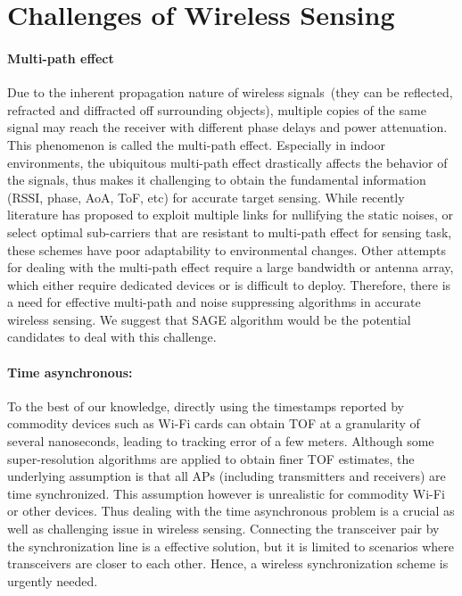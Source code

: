 \section{Challenges of Wireless Sensing}

\paragraph*{Multi-path effect}  Due to the inherent propagation nature of wireless signals~(they can be reflected, refracted and diffracted off
surrounding objects), multiple copies of the same signal may reach the receiver with different phase delays and power attenuation. This
phenomenon is called the multi-path effect. Especially in indoor environments, the ubiquitous multi-path effect drastically affects the
behavior of the signals, thus makes it challenging to obtain the fundamental information (RSSI, phase, AoA, ToF, etc) for accurate target
sensing. While recently literature has proposed to exploit multiple links for nullifying the static noises, or select optimal sub-carriers
that are resistant to multi-path effect for sensing task, these schemes have poor adaptability to environmental changes. Other attempts for
dealing with the multi-path effect require a large bandwidth or antenna array, which either require dedicated devices or is difficult to
deploy. Therefore, there is a need for effective multi-path and noise suppressing algorithms in accurate wireless sensing. We suggest that
SAGE algorithm would be the potential candidates to deal with this challenge.

\paragraph*{Time asynchronous:} To the best of our knowledge, directly using the timestamps reported by commodity devices such as Wi-Fi cards can obtain TOF at a granularity of several nanoseconds, leading to tracking error of a few meters. Although some super-resolution algorithms are applied to obtain finer TOF estimates, the underlying assumption is that all APs (including transmitters and receivers) are time synchronized. This assumption however is unrealistic for commodity Wi-Fi or other devices. Thus dealing with the time asynchronous problem is a crucial as well as challenging issue in wireless sensing. Connecting the transceiver pair by the synchronization line is a effective solution, but it is limited to scenarios where transceivers are closer to each other. Hence, a wireless synchronization scheme is urgently needed.

